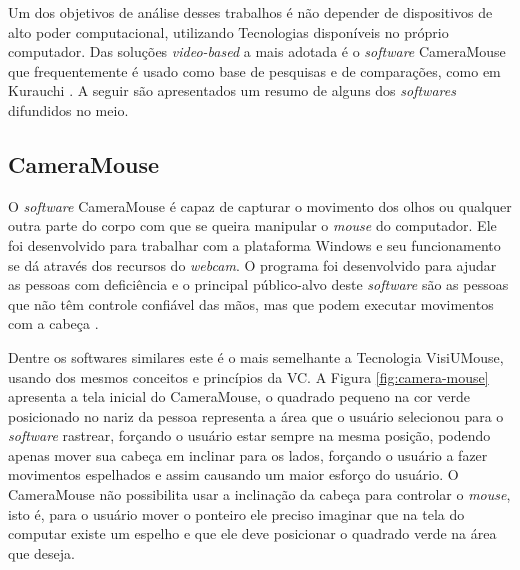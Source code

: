Um dos objetivos de análise desses trabalhos é não depender de dispositivos de alto poder computacional, utilizando Tecnologias disponíveis no próprio computador. Das soluções \textit{video-based} a mais adotada é o \textit{software} CameraMouse \cite{gips2000camera} que frequentemente é usado como base de pesquisas e de comparações, como em Kurauchi \cite{kurauchi2015hmagic}. A seguir são apresentados um resumo de alguns dos \textit{softwares} difundidos no meio.

\subsection{CameraMouse}
O \textit{software} CameraMouse é capaz de capturar o movimento dos olhos ou qualquer outra parte do corpo com que se queira manipular o \textit{mouse} do computador. Ele foi desenvolvido para trabalhar com a plataforma Windows e seu funcionamento se dá através dos recursos do \textit{webcam}. O programa foi desenvolvido para ajudar as pessoas com deficiência e o principal público-alvo deste \textit{software} são as pessoas que não têm controle confiável das mãos, mas que podem executar movimentos com a cabeça .

Dentre os softwares similares este é o mais semelhante a Tecnologia VisiUMouse, usando dos mesmos conceitos e princípios da VC. A Figura \ref{fig:camera-mouse} apresenta a tela inicial do CameraMouse, o quadrado pequeno na cor verde posicionado no nariz da pessoa representa a área que o usuário selecionou para o \textit{software} rastrear, forçando o usuário estar sempre na mesma posição, podendo apenas mover sua cabeça em inclinar para os lados, forçando o usuário a fazer movimentos espelhados  e assim causando um maior esforço do usuário. O CameraMouse não possibilita usar a inclinação da cabeça para controlar o \textit{mouse}, isto é, para o usuário mover o ponteiro ele preciso imaginar que na tela do computar existe um espelho e que ele deve posicionar o quadrado verde na área que deseja.

